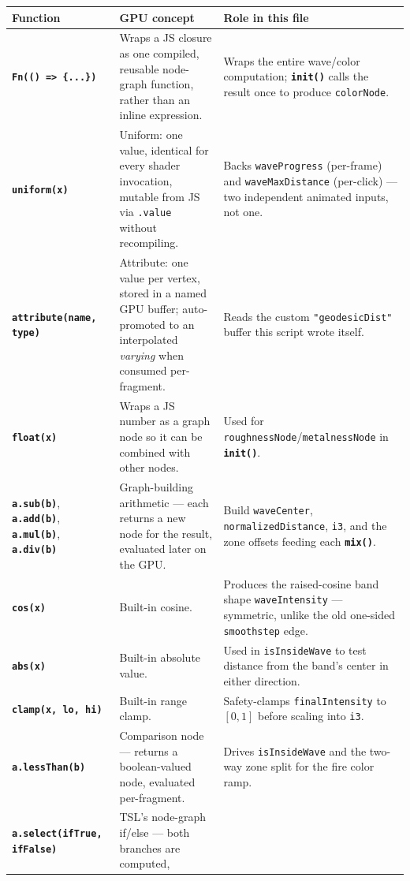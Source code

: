 \documentclass[11pt]{article}
\newcommand{\code}[1]{\texttt{#1}}
\newcommand{\func}[1]{\texttt{\textbf{#1}}}
\begin{document}
\begin{center}
\small
\renewcommand{\arraystretch}{1.35}
\begin{tabular}{@{}p{2.7cm}p{3.6cm}p{7.1cm}@{}}
\toprule
\textbf{Function} & \textbf{GPU concept} & \textbf{Role in this file} \\
\midrule
\func{Fn(() => \{...\})} & Wraps a JS closure as one compiled, reusable node-graph
  function, rather than an inline expression. & Wraps the entire wave/color computation;
  \func{init()} calls the result once to produce \code{colorNode}. \\
\func{uniform(x)} & Uniform: one value, identical for every shader invocation, mutable from
  JS via \code{.value} without recompiling. & Backs \code{waveProgress} (per-frame) and
  \code{waveMaxDistance} (per-click) --- two independent animated inputs, not one. \\
\func{attribute(name, type)} & Attribute: one value per vertex, stored in a named GPU
  buffer; auto-promoted to an interpolated \emph{varying} when consumed per-fragment. &
  Reads the custom \code{"geodesicDist"} buffer this script wrote itself. \\
\func{float(x)} & Wraps a JS number as a graph node so it can be combined with other
  nodes. & Used for \code{roughnessNode}/\code{metalnessNode} in \func{init()}. \\
\func{a.sub(b)}, \func{a.add(b)}, \func{a.mul(b)}, \func{a.div(b)} & Graph-building
  arithmetic --- each returns a new node for the result, evaluated later on the GPU. &
  Build \code{waveCenter}, \code{normalizedDistance}, \code{i3}, and the zone offsets
  feeding each \func{mix()}. \\
\func{cos(x)} & Built-in cosine. & Produces the raised-cosine band shape
  \code{waveIntensity} --- symmetric, unlike the old one-sided \code{smoothstep} edge. \\
\func{abs(x)} & Built-in absolute value. & Used in \code{isInsideWave} to test distance
  from the band's center in either direction. \\
\func{clamp(x, lo, hi)} & Built-in range clamp. & Safety-clamps \code{finalIntensity} to
  $[0,1]$ before scaling into \code{i3}. \\
\func{a.lessThan(b)} & Comparison node --- returns a boolean-valued node, evaluated
  per-fragment. & Drives \code{isInsideWave} and the two-way zone split for the fire color
  ramp. \\
\func{a.select(ifTrue, ifFalse)} & TSL's node-graph if/else --- both branches are computed,

\end{tabular}
\end{center}
\end{document}
